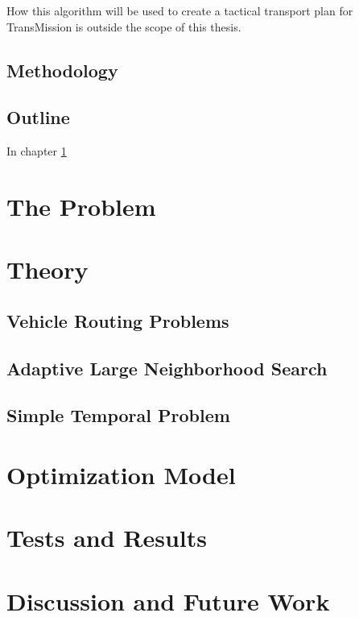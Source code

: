 \documentclass[a4paper]{article}
\begin{document}
How this algorithm will be used to create a tactical transport plan for TransMission is outside the scope of this thesis. 
\subsection{Methodology}

\subsection{Outline}
In chapter \ref{chap:The Problem}



\section{The Problem}
\label{chap:The Problem}
\section{Theory}
\label{chap:Theory}
\subsection{Vehicle Routing Problems}
\subsection{Adaptive Large Neighborhood Search}
\subsection{Simple Temporal Problem}
\section{Optimization Model}
\label{chap:Optimization Model}
\section{Tests and Results}
\label{chap:Tests and Results}
\section{Discussion and Future Work}
\label{chap:Discussion and Future Work}

\newpage


\end{document}

